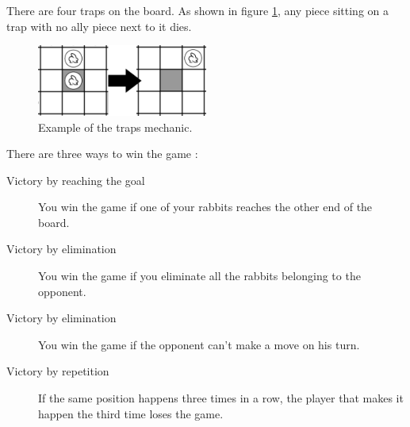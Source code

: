 There are four traps on the board. As shown in figure \ref{fig:trap}, any piece sitting on a trap with no ally piece next to it dies.

\begin{figure}[!h]
\centering
\includegraphics[width=0.5\textwidth]{Pictures/Trap.png}
\caption{\label{fig:trap}Example of the traps mechanic.}
\end{figure}

There are three ways to win the game :

\begin{description}
\item[Victory by reaching the goal] You win the game if one of your rabbits reaches the other end of the board.
\item[Victory by elimination] You win the game if you eliminate all the rabbits belonging to the opponent.
\item[Victory by elimination] You win the game if the opponent can't make a move on his turn.
\item[Victory by repetition] If the same position happens three times in a row, the player that makes it happen the third time loses the game.
\end{description}
